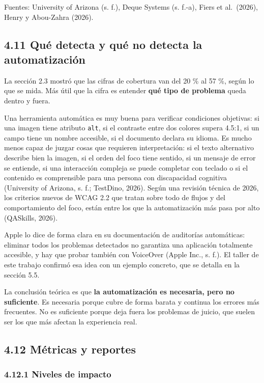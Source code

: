 \documentclass[10pt,letterpaper,onecolumn]{IEEEtran}
\begin{document}
Fuentes: University of Arizona (s. f.), Deque Systems (s. f.-a), Fiers et al.~(2026), Henry y Abou-Zahra (2026).

\subsection{4.11 Qué detecta y qué no detecta la automatización}\label{quuxe9-detecta-y-quuxe9-no-detecta-la-automatizaciuxf3n}

La sección 2.3 mostró que las cifras de cobertura van del 20 \% al 57 \%, según lo que se mida. Más útil que la cifra es entender \textbf{qué tipo de problema} queda dentro y fuera.

Una herramienta automática es muy buena para verificar condiciones objetivas: si una imagen tiene atributo \texttt{alt}, si el contraste entre dos colores supera 4.5:1, si un campo tiene un nombre accesible, si el documento declara su idioma. Es mucho menos capaz de juzgar cosas que requieren interpretación: si el texto alternativo describe bien la imagen, si el orden del foco tiene sentido, si un mensaje de error se entiende, si una interacción compleja se puede completar con teclado o si el contenido es comprensible para una persona con discapacidad cognitiva (University of Arizona, s. f.; TestDino, 2026). Según una revisión técnica de 2026, los criterios nuevos de WCAG 2.2 que tratan sobre todo de flujos y del comportamiento del foco, están entre los que la automatización más pasa por alto (QASkills, 2026).

Apple lo dice de forma clara en su documentación de auditorías automáticas: eliminar todos los problemas detectados no garantiza una aplicación totalmente accesible, y hay que probar también con VoiceOver (Apple Inc., s. f.). El taller de este trabajo confirmó esa idea con un ejemplo concreto, que se detalla en la sección 5.5.

La conclusión teórica es que \textbf{la automatización es necesaria, pero no suficiente}. Es necesaria porque cubre de forma barata y continua los errores más frecuentes. No es suficiente porque deja fuera los problemas de juicio, que suelen ser los que más afectan la experiencia real.

\subsection{4.12 Métricas y reportes}\label{muxe9tricas-y-reportes}

\subsubsection{4.12.1 Niveles de impacto}\label{niveles-de-impacto}
\end{document}
